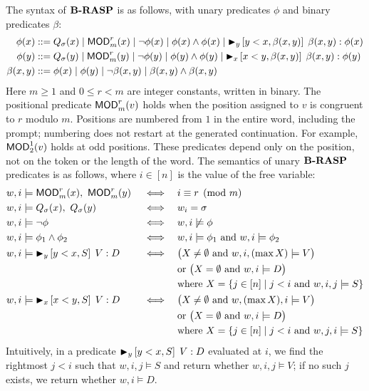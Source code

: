 \documentclass[acmsmall,screen,review,anonymous,nonacm]{PLDI/acmart}
\begin{document}
The syntax of ${\textbf{B-RASP}}$ is as follows, with unary predicates $\phi$ and binary predicates $\beta$:
\begin{align*}
    \phi(x) & \mathrel{::=} Q_\sigma(x) \mid \mathsf{MOD}_m^r(x) \mid \lnot \phi(x) \mid \phi(x)\land \phi(x) \mid {{\ensuremath{{{\blacktriangleright}}_{y} \left[y<x, \beta(x,y)\right] \; \beta(x,y) : \phi(x)}}} \\
    \phi(y) & \mathrel{::=} Q_\sigma(y) \mid \mathsf{MOD}_m^r(y) \mid \lnot \phi(y) \mid \phi(y)\land \phi(y) \mid {{\ensuremath{{{\blacktriangleright}}_{x} \left[x<y, \beta(x,y)\right] \; \beta(x,y) : \phi(y)}}} \\
    \beta(x,y) & \mathrel{::=} \phi(x) \mid \phi(y) \mid \lnot \beta(x,y) \mid \beta(x,y)\land \beta(x,y)
\end{align*}
Here $m\geq1$ and $0\leq r<m$ are integer constants, written in
binary. The positional predicate $\mathsf{MOD}_m^r(v)$ holds when the position
assigned to $v$ is congruent to $r$ modulo $m$. Positions are numbered
from $1$ in the entire word, including the prompt; numbering does not
restart at the generated continuation. For example, $\mathsf{MOD}_2^1(v)$
holds at odd positions. These predicates depend only on the position,
not on the token or the length of the word.
The semantics of unary ${\textbf{B-RASP}}$ predicates is as follows, where $i \in [n]$ is the value of the free variable:
\begin{align*}
    w,i&\models \mathsf{MOD}_m^r(x),\ \mathsf{MOD}_m^r(y) &&\iff && i\equiv r\pmod m\\
    w,i&\models Q_\sigma(x),\ Q_\sigma(y) &&\iff && w_i=\sigma\\
    w,i&\models \lnot \phi &&\iff && w,i\not\models \phi\\
    w,i&\models \phi_1\land \phi_2 &&\iff && w,i\models \phi_1 \text{ and } w,i\models \phi_2\\
    w,i&\models {{\ensuremath{{{\blacktriangleright}}_{y} \left[y<x, S\right] \; V : D}}} &&\iff && \bigl(X\neq\emptyset \text{ and } w,i,(\max X)\models V\bigr) \\
    &&&&& \text{or } \bigl(X=\emptyset \text{ and } w,i\models D\bigr)\\
    &&&&& \text{where } X=\{j\in[n] \mid j<i \text{ and } w,i,j\models S\}\\
    w,i&\models {{\ensuremath{{{\blacktriangleright}}_{x} \left[x<y, S\right] \; V : D}}} &&\iff && \bigl(X\neq\emptyset \text{ and } w,(\max X),i\models V\bigr) \\
    &&&&& \text{or } \bigl(X=\emptyset \text{ and } w,i\models D\bigr)\\
    &&&&& \text{where } X=\{j\in[n] \mid j<i \text{ and } w,j,i\models S\}
\end{align*}
Intuitively, in a predicate ${{{{\blacktriangleright}}_{y} \left[y<x, S\right] \; V : D}}$ evaluated at $i$, we find the rightmost $j<i$ such that $w,i,j\models S$ and return whether $w,i,j\models V$; if no such $j$ exists, we return whether $w,i\models D$.
\end{document}

